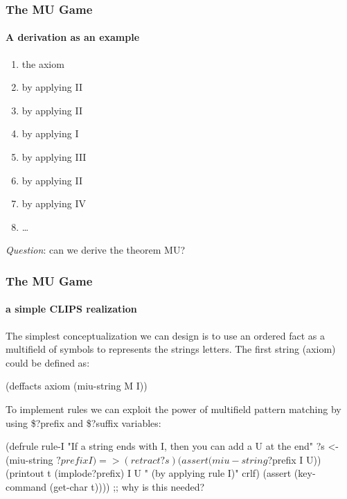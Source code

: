 \documentclass[xcolor={usenames,dvipsnames,svgnames}, compress]{beamer}
\begin{document}
\begin{frame}
  \frametitle{The MU Game}
  \framesubtitle{A derivation as an example}
  \begin{center}
    \begin{enumerate}
    \item { the axiom}
    \item { by applying II}
    \item { by applying II}
    \item { by applying I}
    \item { by applying III}
    \item { by applying II}
    \item { by applying IV}
    \item \dots
    \end{enumerate}
  \end{center}\bigskip
  \emph{Question}: can we derive the theorem
  \textsf{MU}?\par\bigskip
  
\end{frame}


\begin{frame}[fragile]
  \frametitle{The MU Game}
  \framesubtitle{a simple CLIPS realization}

  The simplest conceptualization we can design is to use an ordered
  fact as a multifield of symbols to represents the strings
  letters. The first string (axiom) could be defined as:
  
  \begin{clips-code}[numbers=none]
    (deffacts axiom
        (miu-string M I))
  \end{clips-code}

  To implement rules we can exploit the power of multifield pattern
  matching by using \textsf{\$?prefix} and \textsf{\$?suffix} variables:
  \begin{clips-code}[numbers=none]
    (defrule rule-I
        "If a string ends with I, then you can add a U at the end"
        ?s <- (miu-string $?prefix I)
        =>
        (retract ?s)
        (assert (miu-string $?prefix I U))
        (printout t (implode$ $?prefix) I U " (by applying rule I)" crlf)
        (assert (key-command (get-char t)))) ;; why is this needed?
  \end{clips-code}


\end{frame}
\end{document}
